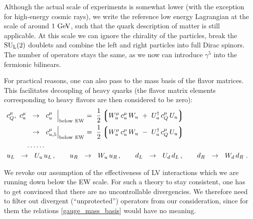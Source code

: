 \documentclass[12pt,preprintnumbers,nofootinbib]{revtex4}
\newcommand{\sul}{{{\rm SU}_{\rm L}(2)}}
\newcommand{\GeV}{{\rm GeV}}
\begin{document}
	Although the actual scale of experiments is somewhat lower
	(with the exception for high-energy cosmic rays),
	we write the reference low energy Lagrangian at the scale of
	around $ 1~\GeV $, such that the quark description of matter is 
	still applicable.
	At this scale we can ignore the chirality of the particles, break the
	$ \sul $ doublets and combine the left and right particles into
	full Dirac spinors. 
	The number of operators stays the same, as we now can introduce
	$ \gamma^5 $ into the fermionic bilinears. 

	For practical reasons, one can also pass to the mass basis of the 
	flavor matrices.
	This facilitates decoupling of heavy quarks (the flavor 
	matrix elements corresponding to heavy flavors are then 
	considered to be zero):
\begin{align}
\label{gauge_mass_basis}
\notag
	c_Q^\mu,\  c_u^\mu  & ~~\rightarrow~~ c_{u\phantom{,5}}^\mu 
				\Bigl|_{\rm below\ EW}  ~=~ \frac{1}{2} 
			\left\lgroup W^\mu_u\, c_u^\mu\, W_u ~+~ U_u^\dag\, c_Q^\mu\, U_u 
						\right\rgroup
	\\
	&
	~~\rightarrow~~ c_{u,5}^\mu 
			\Bigl|_{\rm below\ EW}  ~=~ \frac{1}{2} 
			\left\lgroup W^\mu_u\, c_u^\mu\, W_u ~-~ U_u^\dag\, c_Q^\mu\, U_u 
						\right\rgroup
	\\
\notag
	& \dots\dots
	\\
\notag
	& 
	\hspace{-1.0cm}
	u_L ~~\rightarrow~~ U_u\, u_L\,,   \qquad u_R ~~\rightarrow~~ W_u\, u_R\,, \qquad 
	d_L ~~\rightarrow~~ U_d\, d_L\,,   \qquad d_R ~~\rightarrow~~ W_d\, d_R~.
\end{align}

	We revoke our assumption of the effectiveness of LV interactions 
	which we are running down below the EW scale.
	For such a theory to stay consistent, one has to get convinced that
	there are no uncontrollable divergencies.
	We therefore need to filter out divergent (``unprotected'') operators from our consideration,
	since for them the relations \eqref{gauge_mass_basis} would have no
	meaning.
\end{document}
